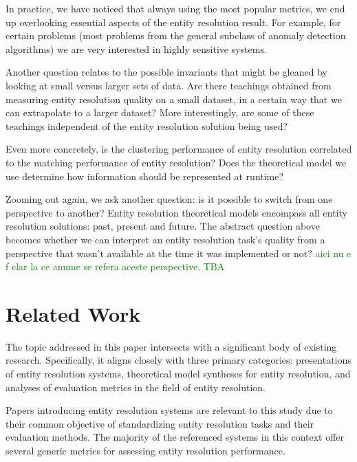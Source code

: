 \documentclass[journal]{IEEEtran}
\begin{document}
    In practice, we have noticed that always using the most popular metrics, we
    end up overlooking essential aspects of the entity resolution result.
    For example, for certain problems (most problems from the general subclass
    of anomaly detection algorithms) we are very interested in highly sensitive
    systems.
    
    Another question relates to the possible invariants that might be gleaned by
    looking at small versus larger sets of data.
    Are there teachings obtained from measuring entity resolution quality on a
    small dataset, in a certain way that we can extrapolate to a larger dataset?
    More interestingly, are some of these teachings independent of the entity
    resolution solution being used?

    Even more concretely, is the clustering performance of entity resolution
    correlated to the matching performance of entity resolution?
    Does the theoretical model we use determine how information should be
    represented at runtime?

    Zooming out again, we ask another question: is it possible to switch from
    one perspective to another?
    Entity resolution theoretical models encompass all entity resolution
    solutions: past, present and future.
    The abstract question above becomes whether we can interpret an entity
    resolution task's quality from a perspective that wasn't available at the
    time it was implemented or not?
    \textcolor{green}{aici nu e f clar la ce anume se refera aceste perspective. TBA}

    \section{Related Work}\label{sec:related}
    
    The topic addressed in this paper intersects with a significant body of
    existing research.
    Specifically, it aligns closely with three primary categories: presentations
    of entity resolution systems, theoretical model syntheses for entity
    resolution, and analyses of evaluation metrics in the field of entity
    resolution.

    Papers introducing entity resolution systems are relevant to this study due
    to their common objective of standardizing entity resolution tasks and their
    evaluation methods.
    The majority of the referenced systems in this context offer several generic
    metrics for assessing entity resolution performance.
\end{document}
